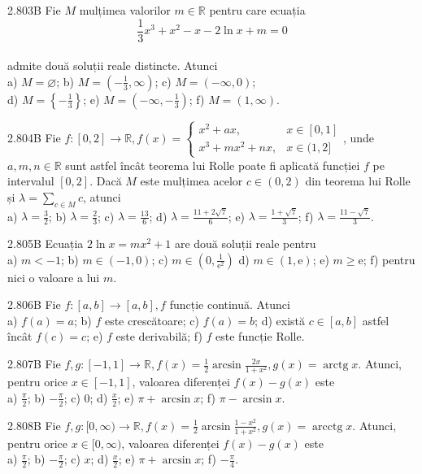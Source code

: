\documentclass[11pt]{article}
\begin{document}
2.803B Fie $M$ mulțimea valorilor $m \in \mathbb{R}$ pentru care ecuația $$\frac{1}{3} x^{3}+x^{2}-x-2 \ln x+m=0$$\\admite două soluții reale distincte. Atunci\\ a) $M=\varnothing$; b) $M=\left(-\frac{1}{3}, \infty\right)$; c) $M=(-\infty, 0)$;\\ d) $M=\left\{-\frac{1}{3}\right\}$; e) $M=\left(-\infty,-\frac{1}{3}\right)$; f) $M=(1, \infty)$.

2.804B Fie $f:[0,2] \rightarrow \mathbb{R}, f(x)= \begin{cases}x^{2}+a x, & x \in[0,1] \\ x^{3}+m x^{2}+n x, & x \in(1,2]\end{cases}$, unde $a, m, n \in \mathbb{R}$ sunt astfel încât teorema lui Rolle poate fi aplicată funcției $f$ pe intervalul $[0,2]$. Dacă $M$ este mulțimea acelor $c \in(0,2)$ din teorema lui Rolle și $\lambda=\sum_{c \in M} c$, atunci\\ a) $\lambda=\frac{3}{2}$; b) $\lambda=\frac{2}{3}$; c) $\lambda=\frac{13}{6}$; d) $\lambda=\frac{11+2 \sqrt{7}}{6}$; e) $\lambda=\frac{1+\sqrt{7}}{3}$; f) $\lambda=\frac{11-\sqrt{7}}{3}$.

2.805B Ecuația $2 \ln x=m x^{2}+1$ are două soluții reale pentru\\ a) $m<-1$; b) $m \in(-1,0)$; c) $m \in\left(0, \frac{1}{\mathrm{e}^{2}}\right)$ d) $m \in(1, \mathrm{e})$; e) $m \geq \mathrm{e}$; f) pentru nici o valoare a lui $m$.

2.806B Fie $f:[a, b] \rightarrow[a, b], f$ funcție continuă. Atunci\\ a) $f(a)=a$; b) $f$ este crescătoare; c) $f(a)=b$; d) există $c \in[a, b]$ astfel încât $f(c)=c$; e) $f$ este derivabilă; f) $f$ este funcție Rolle.

2.807B Fie $f, g:[-1,1] \rightarrow \mathbb{R}, f(x)=\frac{1}{2} \arcsin \frac{2 x}{1+x^{2}}, g(x)=\operatorname{arctg} x$. Atunci, pentru orice $x \in[-1,1]$, valoarea diferenței $f(x)-g(x)$ este\\ a) $\frac{\pi}{2}$; b) $-\frac{\pi}{2}$; c) $0$; d) $\frac{x}{2}$; e) $\pi+\arcsin x$; f) $\pi-\arcsin x$.

2.808B Fie $f, g:[0, \infty) \rightarrow \mathbb{R}, f(x)=\frac{1}{2} \arcsin \frac{1-x^{2}}{1+x^{2}}, g(x)=\operatorname{arcctg} x$. Atunci, pentru orice $x \in[0, \infty)$, valoarea diferenței $f(x)-g(x)$ este\\ a) $\frac{\pi}{2}$; b) $-\frac{\pi}{2}$; c) $x$; d) $\frac{x}{2}$; e) $\pi+\arcsin x$; f) $-\frac{\pi}{4}$.
\end{document}

